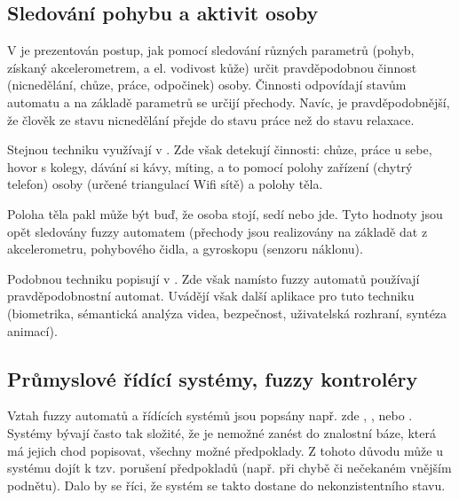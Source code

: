 \documentclass[a4paper,10pt]{article}
\begin{document}
\subsection{Sledování pohybu a aktivit osoby}
V \cite{TriHei-LinSumHumActSkiConAcc} je prezentován postup, jak pomocí sledování různých parametrů (pohyb, získaný akcelerometrem, a el. vodivost kůže) určit pravděpodobnou činnost (nicnedělání, chůze, práce, odpočinek) osoby. Činnosti odpovídají stavům automatu a na základě parametrů se určijí přechody. Navíc, je pravděpodobnější, že člověk ze stavu nicnedělání přejde do stavu práce než do stavu relaxace.

Stejnou techniku využívají v \cite{Alv+-HumActRec+}. Zde však detekují činnosti: chůze, práce u sebe, hovor s kolegy, dávání si kávy, míting, a to pomocí polohy zařízení (chytrý telefon) osoby (určené triangulací Wifi sítě) a polohy těla.

Poloha těla pakl může být buď, že osoba stojí, sedí nebo jde. Tyto hodnoty jsou opět sledovány fuzzy automatem (přechody jsou realizovány na základě dat z akcelerometru, pohybového čidla, a gyroskopu (senzoru náklonu). 

Podobnou techniku popisují v \cite{TurChe-MacRecHumActSur}. Zde však namísto fuzzy automatů používají pravděpodobnostní automat. Uvádějí však další aplikace pro tuto techniku (biometrika, sémantická analýza videa, bezpečnost, uživatelská rozhraní, syntéza animací). 

\subsection{Průmyslové řídící systémy, fuzzy kontroléry}
Vztah fuzzy automatů a řídících systémů 
jsou popsány např. zde \cite{HeKinSep-DecMakFuzEnvZUsOntCon+}, \cite{Gra+-ApFuStFuOuFinMaPrRecVioOntAss}, \cite{WeeFu-FormFuzAutAppModLeaSys} nebo \cite{GraFodDri-HybFuzBooAutOntCont}. 
Systémy bývají často tak složité, že je nemožné zanést do znalostní báze, která má jejich chod popisovat, všechny možné předpoklady. Z tohoto důvodu může u systému dojít k tzv. porušení 
předpokladů (např. při chybě či nečekaném vnějším podnětu). Dalo by se říci, že systém se takto dostane do nekonzistentního stavu.
\end{document}
